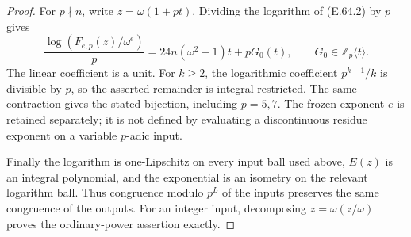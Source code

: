 \begin{proof}
For $p\nmid n$, write
$z=\omega(1+pt)$. Dividing the
logarithm of (E.64.2) by $p$
gives
\[
 \frac{\log(F_{e,p}(z)/\omega^e)}p
   =24n(\omega^2-1)t+pG_0(t),
 \qquad G_0\in\mathbb Z_p\langle t\rangle .
\]
The linear coefficient is a unit.
For $k\geq2$, the logarithmic
coefficient $p^{k-1}/k$ is divisible
by $p$, so the asserted remainder
is integral restricted. The same
contraction gives the stated
bijection, including $p=5,7$.
The frozen exponent $e$ is retained
separately; it is not defined by
evaluating a discontinuous residue
exponent on a variable $p$-adic input.

Finally the logarithm is one-Lipschitz
on every input ball used above,
$E(z)$ is an integral polynomial,
and the exponential is an isometry
on the relevant logarithm ball.
Thus congruence modulo $p^L$ of
the inputs preserves the same
congruence of the outputs.
For an integer input, decomposing
$z=\omega(z/\omega)$ proves the
ordinary-power assertion exactly.
\end{proof}

